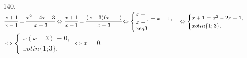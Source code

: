 140. $\cfrac{x+1}{x-1}=\cfrac{x^2-4x+3}{x-3}\Leftrightarrow
\cfrac{x+1}{x-1}=\cfrac{(x-3)(x-1)}{x-3}\Leftrightarrow
\begin{cases} \cfrac{x+1}{x-1}=x-1,\\ x
eq3.\end{cases}\Leftrightarrow
\begin{cases} x+1=x^2-2x+1,\\ x
otin\{1;3\}.\end{cases}$\\$\Leftrightarrow
\begin{cases} x(x-3)=0,\\ x
otin\{1;3\}.\end{cases}\Leftrightarrow x=0.$\\
